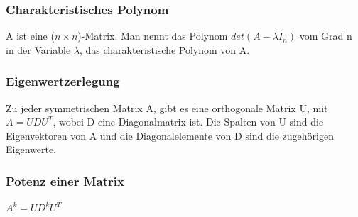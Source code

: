 \documentclass[10pt]{scrartcl}
\begin{document}
\begin{multicols}{2}
\subsubsection*{Charakteristisches Polynom}
A ist eine ($n \times n$)-Matrix. Man nennt das Polynom $det(A - \lambda I_n)$ vom Grad n in der Variable $\lambda$, das charakteristische Polynom von A.
\subsubsection*{Eigenwertzerlegung}
Zu jeder symmetrischen Matrix A, gibt es eine orthogonale Matrix U, mit $A=UDU^T$, wobei D eine Diagonalmatrix ist. Die Spalten von U sind  die Eigenvektoren von A und die Diagonalelemente von D sind die zugehörigen Eigenwerte.
\subsubsection*{Potenz einer Matrix}
$A^k = U D^k U^T$\\

\end{multicols}
\end{document}
